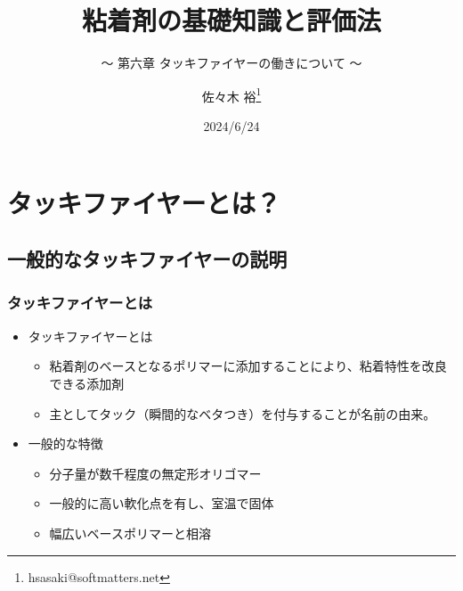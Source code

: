 \documentclass[unicode,12pt]{beamer}%
\title{粘着剤の基礎知識と評価法}
\subtitle{～ 第六章 タッキファイヤーの働きについて ～}
\author[SDL Inc. 佐々木]{佐々木 裕\thanks{hsasaki@softmatters.net}}
\institute[]{元 東亞合成株式会社\\ソフトマターデザインラボ合同会社}
\date{2024/6/24}
\begin{document}
\maketitle

\begin{frame} 
    \tableofcontents[]
\end{frame} 


\section{タッキファイヤーとは？}
\subsection{一般的なタッキファイヤーの説明}

\begin{frame}
	\frametitle{タッキファイヤーとは}
		\begin{itemize}
			\item タッキファイヤーとは
			\begin{itemize}
				\item 粘着剤のベースとなるポリマーに添加することにより、粘着特性を改良できる添加剤
				\item 主としてタック（瞬間的なベタつき）を付与することが名前の由来。
			\end{itemize}
			\item 一般的な特徴
			\begin{itemize}
				\item \alert{分子量が数千程度}の無定形オリゴマー
				\item 一般的に\alert{高い軟化点}を有し、室温で固体
				\item 幅広いベースポリマーと\alert{相溶}
			\end{itemize}
		\end{itemize}
\end{frame}
\end{document}
